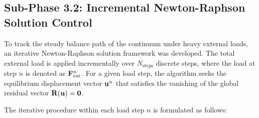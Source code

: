 \subsection{Sub-Phase 3.2: Incremental Newton-Raphson Solution Control}
\label{subsec:nr_solver}

To track the steady balance path of the continuum under heavy external loads, an iterative Newton-Raphson solution framework was developed. The total external load is applied incrementally over $N_{\text{steps}}$ discrete steps, where the load at step $n$ is denoted as $\mathbf{F}_{\text{ext}}^n$. For a given load step, the algorithm seeks the equilibrium displacement vector $\mathbf{u}^n$ that satisfies the vanishing of the global residual vector $\mathbf{R}(\mathbf{u}) = \mathbf{0}$.

The iterative procedure within each load step $n$ is formulated as follows:
